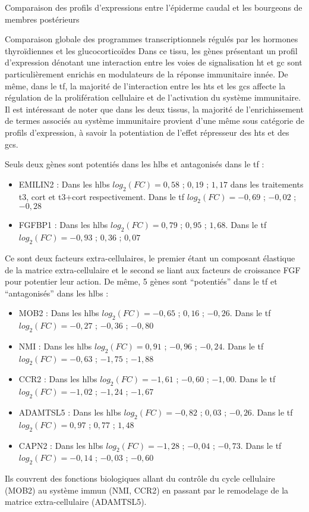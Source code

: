 \documentclass[../main.tex]{subfiles}
\begin{document}
\begin{chapter}{Comparaison des profils d'expressions entre l'épiderme caudal et les bourgeons de membres postérieurs}
\begin{section}{Comparaison globale des programmes transcriptionnels régulés par les hormones thyroïdiennes et les glucocorticoïdes}
Dans ce tissu, les gènes présentant un profil d'expression dénotant une interaction entre les voies de signalisation \gls{ht} et \gls{gc} sont particulièrement enrichis en modulateurs de la réponse immunitaire innée.
De même, dans le \gls{tf}, la majorité de l'interaction entre les \glspl{ht} et les \glspl{gc} affecte la régulation de la prolifération cellulaire et de l'activation du système immunitaire.
Il est intéressant de noter que dans les deux tissus, la majorité de l'enrichissement de termes associés au système immunitaire provient d'une même sous catégorie de profils d'expression, à savoir la potentiation de l'effet répresseur des \glspl{ht} et des \glspl{gc}.
\par
Seuls deux gènes sont potentiés dans les \glspl{hlb} et antagonisés dans le \gls{tf} :
\begin{itemize}
\item EMILIN2 : Dans les \glspl{hlb} $log_2(FC)=0,58$ ; $0,19$ ; $1,17$ dans les traitements \gls{t3}, \gls{cort} et \gls{t3}+\gls{cort} respectivement. Dans le \gls{tf} $log_2(FC)=-0,69$ ; $-0,02$ ; $-0,28$
\item FGFBP1 : Dans les \glspl{hlb} $log_2(FC)=0,79$ ; $0,95$ ; $1,68$. Dans le \gls{tf} $log_2(FC)=-0,93$ ; $0,36$ ; $0,07$
\end{itemize}
Ce sont deux facteurs extra-cellulaires, le premier étant un composant élastique de la matrice extra-cellulaire et le second se liant aux facteurs de croissance FGF pour potentier leur action.
De même, 5 gènes sont ``potentiés'' dans le \gls{tf} et ``antagonisés'' dans les \glspl{hlb} :
\begin{itemize}
\item MOB2 : Dans les \glspl{hlb} $log_2(FC)=-0,65$ ; $0,16$ ; $-0,26$. Dans le \gls{tf} $log_2(FC)=-0,27$ ; $-0,36$ ; $-0,80$
\item NMI : Dans les \glspl{hlb} $log_2(FC)=0,91$ ; $-0,96$ ; $-0,24$. Dans le \gls{tf} $log_2(FC)=-0,63$ ; $-1,75$ ; $-1,88$
\item CCR2 : Dans les \glspl{hlb} $log_2(FC)=-1,61$ ; $-0,60$ ; $-1,00$. Dans le \gls{tf} $log_2(FC)=-1,02$ ; $-1,24$ ; $-1,67$
\item ADAMTSL5 : Dans les \glspl{hlb} $log_2(FC)=-0,82$ ; $0,03$ ; $-0,26$. Dans le \gls{tf} $log_2(FC)=0,97$ ; $0,77$ ; $1,48$
\item CAPN2 : Dans les \glspl{hlb} $log_2(FC)=-1,28$ ; $-0,04$ ; $-0,73$. Dans le \gls{tf} $log_2(FC)=-0,14$ ; $-0,03$ ; $-0,60$
\end{itemize}
Ils couvrent des fonctions biologiques allant du contrôle du cycle cellulaire (MOB2) au système immun (NMI, CCR2) en passant par le remodelage de la matrice extra-cellulaire (ADAMTSL5).


\end{section}
\end{chapter}
\end{document}
